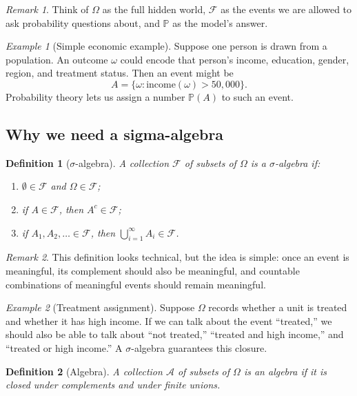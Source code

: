 \documentclass[11pt]{article}
\newtheorem{definition}{Definition}[section]
\theoremstyle{remark}
\newtheorem{remark}{Remark}[section]
\newtheorem{example}{Example}[section]
\newcommand{\PP}{\mathbb{P}}
\newcommand{\1}{\mathbbm{1}}
\newcommand{\cF}{\mathcal{F}}
\newcommand{\cA}{\mathcal{A}}
\begin{document}
\begin{remark}
Think of \(\Omega\) as the full hidden world, \(\cF\) as the events we are allowed to ask probability questions about, and \(\PP\) as the model's answer.
\end{remark}

\begin{example}[Simple economic example]
Suppose one person is drawn from a population. An outcome \(\omega\) could encode that person's income, education, gender, region, and treatment status. Then an event might be
\[
  A = \{\omega : \text{income}(\omega) > 50{,}000\}.
\]
Probability theory lets us assign a number \(\PP(A)\) to such an event.
\end{example}

\subsection{Why we need a sigma-algebra}

\begin{definition}[\(\sigma\)-algebra]
A collection \(\cF\) of subsets of \(\Omega\) is a \emph{\(\sigma\)-algebra} if:
\begin{enumerate}[label=(\roman*)]
  \item \(\emptyset \in \cF\) and \(\Omega \in \cF\);
  \item if \(A \in \cF\), then \(A^c \in \cF\);
  \item if \(A_1,A_2,\dots \in \cF\), then \(\bigcup_{i=1}^{\infty} A_i \in \cF\).
\end{enumerate}
\end{definition}

\begin{remark}
This definition looks technical, but the idea is simple: once an event is meaningful, its complement should also be meaningful, and countable combinations of meaningful events should remain meaningful.
\end{remark}

\begin{example}[Treatment assignment]
Suppose \(\Omega\) records whether a unit is treated and whether it has high income. If we can talk about the event ``treated,'' we should also be able to talk about ``not treated,'' ``treated and high income,'' and ``treated or high income.'' A \(\sigma\)-algebra guarantees this closure.
\end{example}

\begin{definition}[Algebra]
A collection \(\cA\) of subsets of \(\Omega\) is an \emph{algebra} if it is closed under complements and under \emph{finite} unions.
\end{definition}
\end{document}
